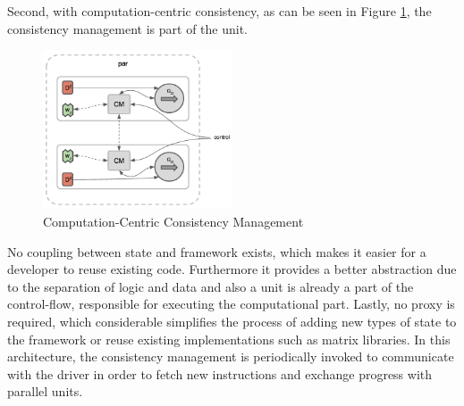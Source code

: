 Second, with computation-centric consistency, as can be seen in Figure \ref{fig:computation_centric_consistency}, the consistency management is part of the unit.
\begin{figure}[ht]
\centering
\includegraphics[width=0.5\textwidth]{img/computation_centric_consist.png}
\caption{Computation-Centric Consistency Management}
\label{fig:computation_centric_consistency}
\end{figure}
No coupling between state and framework exists, which makes it easier for a developer to reuse existing code.
Furthermore it provides a better abstraction due to the separation of logic and data and also a unit is already a part of the control-flow, responsible for executing the computational part.
Lastly, no proxy is required, which considerable simplifies the process of adding new types of state to the framework or reuse existing implementations such as matrix libraries.
In this architecture, the consistency management is periodically invoked to communicate with the driver in order to fetch new instructions and exchange progress with parallel units.

